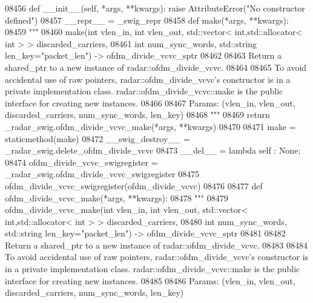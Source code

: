 \begin{DoxyCode}
{{{{{{{{{{{{{{{{{{{{{{{{{{{{08456     \textcolor{keyword}{def }__init__(self, *args, **kwargs): \textcolor{keywordflow}{raise} AttributeError(\textcolor{stringliteral}{"No constructor defined"})
08457     \_\_repr\_\_ = \_swig\_repr
08458     \textcolor{keyword}{def }make(*args, **kwargs):
08459         \textcolor{stringliteral}{"""}
08460 \textcolor{stringliteral}{        make(int vlen\_in, int vlen\_out, std::vector< int,std::allocator< int > > discarded\_carriers, }
08461 \textcolor{stringliteral}{            int num\_sync\_words, std::string len\_key="packet\_len") -> ofdm\_divide\_vcvc\_sptr}
08462 \textcolor{stringliteral}{}
08463 \textcolor{stringliteral}{        Return a shared\_ptr to a new instance of radar::ofdm\_divide\_vcvc.}
08464 \textcolor{stringliteral}{}
08465 \textcolor{stringliteral}{        To avoid accidental use of raw pointers, radar::ofdm\_divide\_vcvc's constructor is in a private
       implementation class. radar::ofdm\_divide\_vcvc::make is the public interface for creating new instances.}
08466 \textcolor{stringliteral}{}
08467 \textcolor{stringliteral}{        Params: (vlen\_in, vlen\_out, discarded\_carriers, num\_sync\_words, len\_key)}
08468 \textcolor{stringliteral}{        """}
08469         \textcolor{keywordflow}{return} \_radar\_swig.ofdm\_divide\_vcvc\_make(*args, **kwargs)
08470 
08471     make = staticmethod(make)
08472     \_\_swig\_destroy\_\_ = \_radar\_swig.delete\_ofdm\_divide\_vcvc
08473     \_\_del\_\_ = \textcolor{keyword}{lambda} self : \textcolor{keywordtype}{None};
08474 ofdm\_divide\_vcvc\_swigregister = \_radar\_swig.ofdm\_divide\_vcvc\_swigregister
08475 ofdm_divide_vcvc_swigregister(ofdm\_divide\_vcvc)
08476 
08477 \textcolor{keyword}{def }ofdm_divide_vcvc_make(*args, **kwargs):
08478   \textcolor{stringliteral}{"""}
08479 \textcolor{stringliteral}{    ofdm\_divide\_vcvc\_make(int vlen\_in, int vlen\_out, std::vector< int,std::allocator< int > >
       discarded\_carriers, }
08480 \textcolor{stringliteral}{        int num\_sync\_words, std::string len\_key="packet\_len") -> ofdm\_divide\_vcvc\_sptr}
08481 \textcolor{stringliteral}{}
08482 \textcolor{stringliteral}{    Return a shared\_ptr to a new instance of radar::ofdm\_divide\_vcvc.}
08483 \textcolor{stringliteral}{}
08484 \textcolor{stringliteral}{    To avoid accidental use of raw pointers, radar::ofdm\_divide\_vcvc's constructor is in a private
       implementation class. radar::ofdm\_divide\_vcvc::make is the public interface for creating new instances.}
08485 \textcolor{stringliteral}{}
08486 \textcolor{stringliteral}{    Params: (vlen\_in, vlen\_out, discarded\_carriers, num\_sync\_words, len\_key)}
}}}}}}}}}}}}}}}}}}}}}}}}}}}}
\end{DoxyCode}
